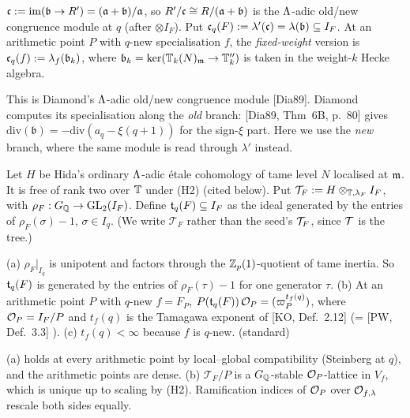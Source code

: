 \begin{definition}\label{def:s06-ctam}
$\mathfrak{c}:=\mathrm{im}(\mathfrak{b}\to R')=(\mathfrak{a}+\mathfrak{b})/\mathfrak{a}$, so $R'/\mathfrak{c}\cong R/(\mathfrak{a}+\mathfrak{b})$ is the $\Lambda$-adic old/new congruence module at $q$
(after $\otimes I_F$). Put $\mathfrak{c}_q(F):=\lambda'(\mathfrak{c})=\lambda(\mathfrak{b})\subseteq I_F$. At an arithmetic point $P$ with $q$-new
specialisation $f$, the \emph{fixed-weight} version is $\mathfrak{c}_q(f):=\lambda_f(\mathfrak{b}_k)$, where $\mathfrak{b}_k=\ker(\mathbb{T}_k(N)_{\mathfrak{m}}\to\mathbb{T}''_k)$ is taken
in the weight-$k$ Hecke algebra. 
\end{definition}
\noindent This is Diamond's $\Lambda$-adic old/new congruence module [Dia89]. Diamond computes its specialisation along the \emph{old}
branch: [Dia89, Thm~6B, p.~80]
 \stcited{} gives
$\mathrm{div}(\mathfrak b)=-\mathrm{div}(a_q-\xi(q+1))$ for the sign-$\xi$ part. Here we use the \emph{new} branch, where the same
module is read through $\lambda'$ instead.

\begin{definition}\label{def:s06-tam}
Let $H$ be Hida's ordinary $\Lambda$-adic étale cohomology of tame level $N$ localised at $\mathfrak{m}$. It is free of rank two over $\mathbb{T}$
under (H2) (cited below). Put $\mathcal T_F:=H\otimes_{\mathbb{T},\lambda_F}I_F$, with $\rho_F:G_{\mathbb{Q}}\to\mathrm{GL}_2(I_F)$. Define
$\mathfrak{t}_q(F)\subseteq I_F$ as the ideal generated by the entries of $\rho_F(\sigma)-1$, $\sigma\in I_q$. (We write $\mathcal T_F$
rather than the seed's $\mathcal{T}_F$, since $\mathcal{T}$ is the tree.) 
\end{definition}

\begin{lemma}\label{lem:s06-tam}
(a) $\rho_F|_{I_q}$ is unipotent and factors through the $\mathbb{Z}_p(1)$-quotient of tame inertia. So $\mathfrak{t}_q(F)$ is generated by the
entries of $\rho_F(\tau)-1$ for one generator $\tau$. (b) At an arithmetic point $P$ with $q$-new $f=F_P$,
$P(\mathfrak{t}_q(F))\,\mathcal{O}_P=(\varpi_P^{t_f(q)})$, where $\mathcal{O}_P=I_F/P$ and $t_f(q)$ is the Tamagawa exponent of
[KO, Def.~2.12]  (= [PW, Def.~3.3]
). (c) $t_f(q)<\infty$ because $f$ is $q$-new. \sttoprove{} (standard)
\end{lemma}
\noindent (a) holds at every arithmetic point by local--global compatibility (Steinberg at $q$), and the arithmetic points are dense.
(b) $\mathcal T_F/P$ is a $G_{\mathbb{Q}}$-stable $\mathcal{O}_P$-lattice in $V_f$, which is unique up to scaling by (H2). Ramification indices of
$\mathcal{O}_P$ over $\mathcal{O}_{f,\lambda}$ rescale both sides equally.

